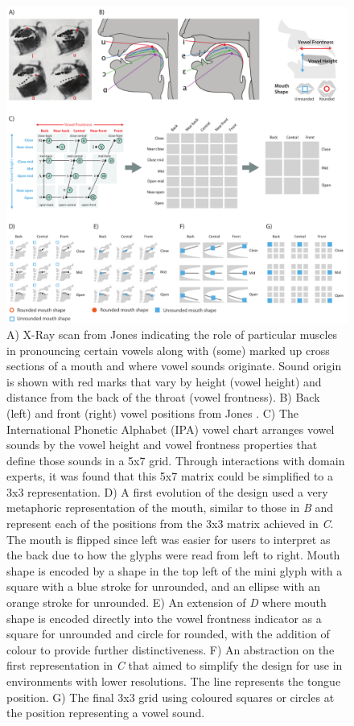 \begin{figure}[t!]
\centering
\includegraphics[width=\textwidth]{images/other_glyphs/poem-glyph-design-progression}
\caption{A) X-Ray scan from Jones \cite{jones1972outline} indicating the role of particular muscles in pronouncing certain vowels along with (some) marked up cross sections of a mouth and where vowel sounds originate.
Sound origin is shown with red marks that vary by height (vowel height) and distance from the back of the throat (vowel frontness).
B) Back (left) and front (right) vowel positions from Jones \cite{jones1972outline}.
C) The International Phonetic Alphabet (IPA) vowel chart \cite{ipa1999} arranges vowel sounds by the vowel height and vowel frontness properties that define those sounds in a 5x7 grid.
Through interactions with domain experts, it was found that this 5x7 matrix could be simplified to a 3x3 representation.
D) A first evolution of the design used a very metaphoric representation of the mouth, similar to those in \emph{B} and represent each of the positions from the 3x3 matrix achieved in \emph{C}.
The mouth is flipped since left was easier for users to interpret as the back due to how the glyphs were read from left to right.
Mouth shape is encoded by a shape in the top left of the mini glyph with a square with a blue stroke for unrounded, and an ellipse with an orange stroke for unrounded.
E) An extension of \emph{D} where mouth shape is encoded directly into the vowel frontness indicator as a square for unrounded and circle for rounded, with the addition of colour to provide further distinctiveness.
F) An abstraction on the first representation in \emph{C} that aimed to simplify the design for use in environments with lower resolutions. The line represents the tongue position.
G) The final 3x3 grid using coloured squares or circles at the position representing a vowel sound.}
\label{fig:poem_glyph_design_progression}
\end{figure}


